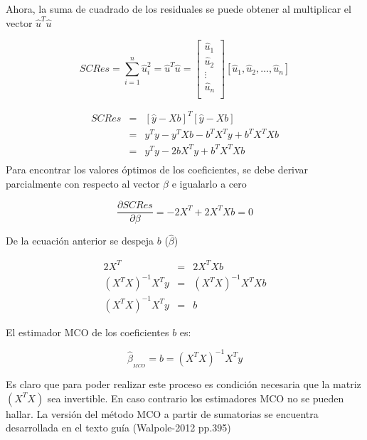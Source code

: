 \documentclass[base=hide,12pt]{elegantbook}
\begin{document}
Ahora, la suma de cuadrado de los residuales  se puede obtener al multiplicar el vector $\widehat{u}^{T} \widehat{u}$
 	
	\begin{equation*}
	SCRes=\sum_{i=1}^{n} \widehat{u}^{2}_{i} = \widehat{u}^{T} \widehat{u}=
	\begin{bmatrix}{\widehat{u}_{1}}\\
	{\widehat{u}_{2}}\\
	{\vdots}\\
	{\widehat{u}_{n}}\\
	\end{bmatrix}[\widehat{u}_{1},\widehat{u}_{2},\dots,\widehat{u}_{n}] 
	\end{equation*}
	
	\begin{eqnarray*}
		SCRes&=&[\widehat{y}-Xb]^{T}[\widehat{y}-Xb]\\
		&=& y^{T}y -y^{T}Xb-b^{T}X^{T}y+b^{T}X^{T}Xb \\
		&=& y^{T}y -2bX^{T}y+b^{T}X^{T}Xb \\ 
	\end{eqnarray*}
	Para encontrar los valores óptimos de los coeficientes, se debe derivar parcialmente con respecto al vector $\beta$ e igualarlo a cero
	
	\begin{equation*}
	\dfrac{\partial{SCRes}}{\partial{\beta}}= -2X^{T}+ 2X^{T}Xb=0
	\end{equation*}
	
	De la ecuación anterior se despeja $b$ ($\widehat{\beta}$)

	\begin{eqnarray*}
		2X^{T} &=& 2X^{T}Xb\\
		(X^{T}X)^{-1}X^{T}y &=&(X^{T}X)^{-1}X^{T}X b\\
		(X^{T}X)^{-1}X^{T}y&=& b
	\end{eqnarray*}

	El estimador MCO de los coeficientes $b$ es:

\begin{Box2}{}
	\begin{equation*}
	\widehat{\beta}_{_{MCO}}= b = (X^{T}X)^{-1}X^{T}y
	\end{equation*}
\end{Box2}
	
Es claro que para poder realizar este proceso es condición necesaria que la matriz $(X^{T}X)$ sea invertible. En caso contrario los estimadores MCO no se pueden hallar.
	La versión del método MCO a partir de sumatorias se encuentra desarrollada en el texto guía (Walpole-2012 pp.395) \\
	
\end{document}
